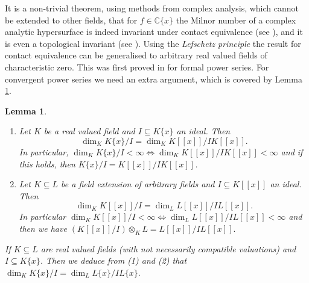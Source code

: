 \documentclass[11pt]{article}
\newtheorem{Lemma}[Definition]{Lemma}
\newcommand{\C}{{\mathbb C}}
\begin{document}
   It is a non-trivial theorem, using methods from complex analysis, which
   cannot be extended to other fields, that for $f \in \C\{x\}$  the
   Milnor number of a complex analytic hypersurface is indeed invariant under contact
   equivalence (see \cite[p.~262]{Gr75}), and it is even a topological
   invariant (see \cite{LeR}). Using the 
   {\em Lefschetz principle}  the result for contact equivalence can be 
   generalised to arbitrary  real valued fields of
   characteristic zero.  {This was first proved in \cite[Theorem 1]{BGM12} for formal power series. For convergent power series we need an extra argument, which is covered by Lemma \ref{lem.lefschetz}.}
   
 \begin{Lemma}\label{lem.lefschetz}\text{  }
\begin{enumerate} 
\item [(1)]  Let $K$ be a real valued field and  $I\subseteq K\{x\}$ an ideal. Then   
$$\dim_K K\{x\}/I =\dim_K K[[x]]/I K[[x]].$$ 
In particular,
$\dim_K K\{x\}/I< \infty \iff \dim_K K[[x]]/I K[[x]]< \infty $ and if this holds, then $K\{x\}/I = K[[x]]/I K[[x]]$.
\item [(2)]  Let $K\subseteq L$ be a field extension of arbitrary fields and $I\subseteq K[[x]]$ an ideal. Then 
$$\dim_K K[[x]]/I=\dim_{L} L[[x]]/IL[[x]].$$ 
In particular
 $\dim_K K[[x]]/I < \infty \iff \dim_L L[[x]]/I L[[x]]< \infty $ 
  and then we have  $(K[[x]]/I)\otimes_K L=L[[x]]/I L[[x]].$
\end{enumerate} 
If $K\subseteq L$ are real valued fields (with not necessarily compatible valuations) and $I\subseteq K\{x\}$. Then we deduce from (1) and (2) that 
$\dim_K K\{x\}/I=\dim_{L} L\{x\}/IL\{x\}.$ 
\end{Lemma}
   
\end{document}
